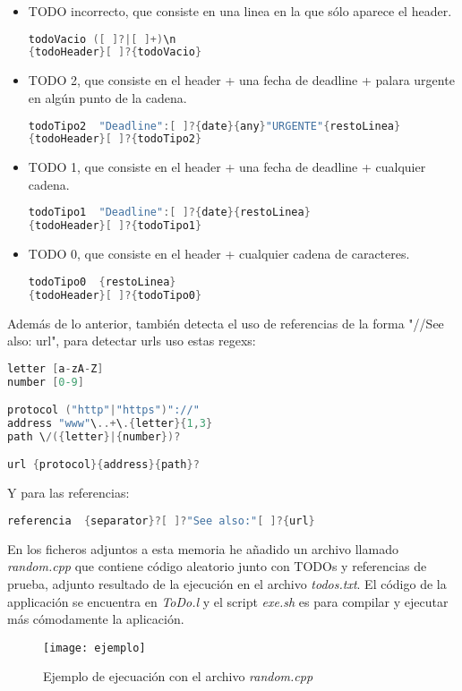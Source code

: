 \documentclass[a4paper, 11pt]{article}
\begin{document}
\begin{itemize}
\item TODO incorrecto, que consiste en una linea en la que sólo aparece el header.
\begin{lstlisting}[language=C]
todoVacio ([ ]?|[ ]+)\n
{todoHeader}[ ]?{todoVacio}
\end{lstlisting}
\item TODO 2, que consiste en el header + una fecha de deadline + palara urgente en algún punto de la cadena.
\begin{lstlisting}[language=C]
todoTipo2  "Deadline":[ ]?{date}{any}"URGENTE"{restoLinea}
{todoHeader}[ ]?{todoTipo2}
\end{lstlisting}
\item TODO 1, que consiste en el header + una fecha de deadline + cualquier cadena.
\begin{lstlisting}[language=C]
todoTipo1  "Deadline":[ ]?{date}{restoLinea}
{todoHeader}[ ]?{todoTipo1}
\end{lstlisting}
\item TODO 0, que consiste en el header + cualquier cadena de caracteres.
\begin{lstlisting}[language=C]
todoTipo0  {restoLinea}
{todoHeader}[ ]?{todoTipo0}
\end{lstlisting}

\end{itemize}

Además de lo anterior, también detecta el uso de referencias de la forma "//See also: url", para detectar urls uso estas regexs:
\begin{lstlisting}[language=C]
letter [a-zA-Z]
number [0-9]

protocol ("http"|"https")"://"
address "www"\..+\.{letter}{1,3}
path \/({letter}|{number})?

url {protocol}{address}{path}?
\end{lstlisting}

Y para las referencias:
\begin{lstlisting}[language=C]
referencia  {separator}?[ ]?"See also:"[ ]?{url}
\end{lstlisting}

En los ficheros adjuntos a esta memoria he añadido un archivo llamado \textit{random.cpp} que contiene código aleatorio junto con TODOs y referencias de prueba, adjunto resultado de la ejecución en el archivo \textit{todos.txt}. El código de la applicación se encuentra en \textit{ToDo.l} y el script \textit{exe.sh} es para compilar y ejecutar más cómodamente la aplicación.

\begin{figure}[h]
\center
\texttt{[image: ejemplo]}
\caption{Ejemplo de ejecuación con el archivo \textit{random.cpp}}
\end{figure}
\end{document}

